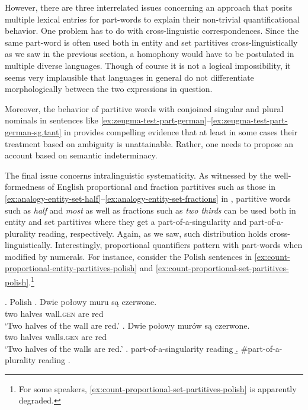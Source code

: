 \begin{sloppypar}
However, there are three interrelated issues concerning an approach that posits multiple lexical entries for part-words to explain their non-trivial quantificational behavior. One problem has to do with cross-linguistic correspondences. Since the same part-word is often used both in entity and set partitives cross-linguistically as we saw in the previous section, a homophony would have to be postulated in multiple diverse languages. Though of course it is not a logical impossibility, it seems very implausible that languages in general do not differentiate morphologically between the two expressions in question.
\end{sloppypar}

Moreover, the behavior of partitive words with conjoined singular and plural nominals in sentences like \ref{ex:zeugma-test-part-german}--\ref{ex:zeugma-test-part-german-sg.tant} in  provides compelling evidence that at least in some cases their treatment based on ambiguity is unattainable. Rather, one needs to propose an account based on semantic indeterminacy.

The final issue concerns intralinguistic systematicity. As witnessed by the well-formedness of English proportional and fraction partitives such as those in \ref{ex:analogy-entity-set-half}--\ref{ex:analogy-entity-set-fractions} in , partitive words such as \textit{half} and \textit{most} as well as fractions such as \textit{two thirds} can be used both in entity and set partitives where they get a part-of-a-singularity and part-of-a-plurality reading, respectively. Again, as we saw, such distribution holds cross-linguistically. Interestingly, proportional quantifiers pattern with part-words when modified by numerals. For instance, consider the Polish sentences in \ref{ex:count-proportional-entity-partitives-polish} and \ref{ex:count-proportional-set-partitives-polish}.\footnote{For some speakers, \ref{ex:count-proportional-set-partitives-polish} is apparently degraded.} 

\ex.\label{ex:count-proportional-partitives-polish} Polish
\ag. Dwie połowy muru są czerwone.\label{ex:count-proportional-entity-partitives-polish}\\
two halves wall\textsc{.gen} are red\\
`Two halves of the wall are red.'
\bg. Dwie połowy murów są czerwone.\label{ex:count-proportional-set-partitives-polish}\\
two halves walls\textsc{.gen} are red\\
`Two halves of the walls are red.'
\a. part-of-a-singularity reading
\b. \#part-of-a-plurality reading
\z.

